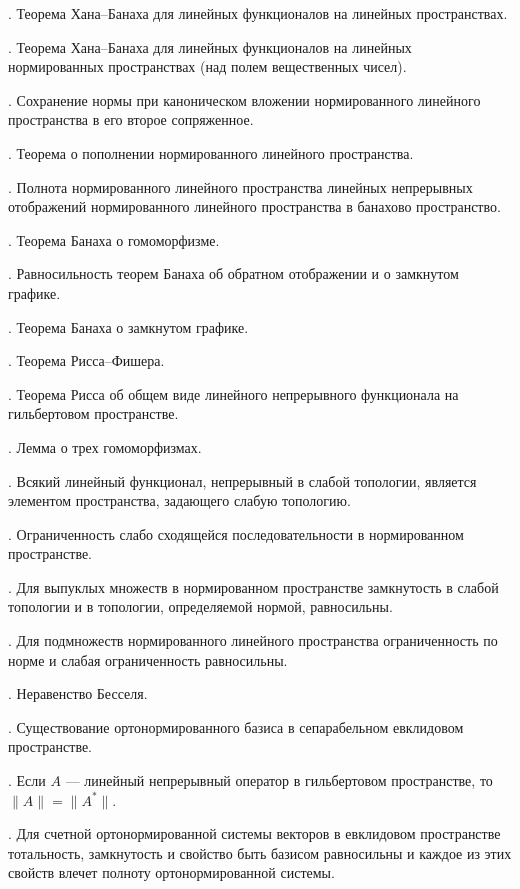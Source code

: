 \documentclass[12pt,titlepage, a4paper]{article}
\begin{document}
. Теорема Хана--Банаха для линейных функционалов на
линейных пространствах.

. Теорема Хана--Банаха для линейных функционалов на
линейных нормированных пространствах (над полем вещественных чисел).

. Сохранение нормы при каноническом вложении
нормированного линейного пространства в его второе сопряженное.

. Теорема о пополнении нормированного линейного
пространства.

. Полнота нормированного линейного пространства линейных
непрерывных отображений нормированного линейного пространства в
банахово пространство.

. Теорема Банаха о гомоморфизме.

. Равносильность теорем Банаха об обратном отображении и
о замкнутом графике.

. Теорема Банаха о замкнутом графике.

. Теорема Рисса--Фишера.

. Теорема Рисса об общем виде линейного непрерывного
функционала на гильбертовом пространстве.

. Лемма о трех гомоморфизмах.

. Всякий линейный функционал, непрерывный в слабой
топологии, является элементом пространства, задающего слабую
топологию.

. Ограниченность слабо сходящейся последовательности в
нормированном пространстве.

. Для выпуклых множеств в нормированном пространстве
замкнутость в слабой топологии и в топологии, определяемой нормой,
равносильны.

. Для подмножеств нормированного линейного пространства
ограниченность по норме и слабая ограниченность равносильны.

. Неравенство Бесселя.

. Существование ортонормированного базиса в
сепарабельном евклидовом пространстве.

. Если $A$ --- линейный непрерывный оператор в
гильбертовом пространстве, то $\|A\|=\|A^*\|$.

. Для счетной ортонормированной системы векторов в
евклидовом пространстве тотальность, замкнутость и свойство быть
базисом равносильны и каждое из этих свойств влечет полноту
ортонормированной системы.
\end{document}
